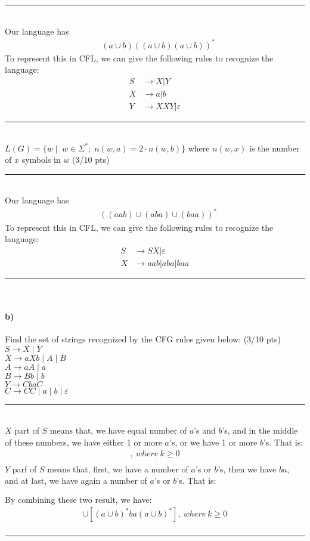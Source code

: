 \documentclass[a4paper,12pt]{article}
\newcommand{\HRule}{\rule{\linewidth}{1mm}}
\begin{document}
\HRule\\
Our language has
\begin{align*}
	&(a \cup b)((a \cup b)(a \cup b))^{*}
\end{align*}
To represent this in CFL, we can give the following rules to recognize the language:
\begin{align*}
S &\rightarrow X | Y \\
X &\rightarrow a |b \\
Y &\rightarrow XXY | \varepsilon
\end{align*}
\HRule\\

$L(G)=\{w \mid \;  w \in \Sigma^*;\; n(w,a)=2\cdot n(w,b)\}$ where $n(w,x)$ is the number of $x$ symbols in $w$ \hfill \small{(3/10 pts)} \\

\HRule\\
Our language has
\begin{align*}
	&((aab)\cup(aba)\cup(baa))^{*}
\end{align*}
To represent this in CFL, we can give the following rules to recognize the language:
\begin{align*}
S &\rightarrow SX | \varepsilon \\
X &\rightarrow aab| aba |baa
\end{align*}
\HRule\\

\paragraph{b)} Find the set of strings recognized by the CFG rules given below:         \hfill \small{(3/10 pts)} \\


$S \to X \mid Y$ \\
$X \to aXb \mid A \mid B$ \\
$A \to aA \mid a$ \\
$B \to Bb \mid b$ \\
$Y \to CbaC$ \\
$C \to CC \mid a \mid b \mid \varepsilon$  \\

\HRule\\
$X$ part of $S$ means that, we have equal number of $a$'s and $b$'s, and in the middle of these numbers, we have either 1 or more $a$'s, or we have 1 or more $b$'s. That is:
\begin{align*}
[a^k(aa^* \cup bb^*)b^k],\ where\ k\geq 0 \\
\end{align*}
$Y$ parf of $S$ means that, first, we have a number of $a$'s or $b$'s, then we have $ba$, and at last, we have again a number of $a$'s or $b$'s.  That is:
\begin{align*}
[(a \cup b)^* ba (a \cup b)^*]\\
\end{align*}
By combining these two result, we have:
\begin{align*}
[a^k(aa^* \cup bb^*)b^k] \cup [(a \cup b)^* ba (a \cup b)^*],\ where\ k\geq 0\\
\end{align*}
\HRule\\
\end{document}
